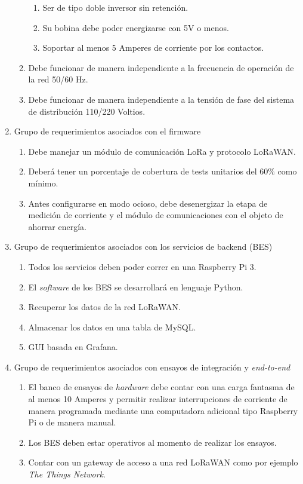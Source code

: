 \begin{enumerate}
\begin{enumerate}
\begin{enumerate}
			\item Ser de tipo doble inversor sin retención.
			\item Su bobina debe poder energizarse con 5V o menos.
			\item Soportar al menos 5 Amperes de corriente por los contactos.
		\end{enumerate} 
		\item Debe funcionar de manera independiente a la frecuencia de operación de la red 50/60 Hz.
		\item Debe funcionar de manera independiente a la tensión de fase del sistema de distribución 110/220 Voltios.
	\end{enumerate}
	\item Grupo de requerimientos asociados con el firmware
	\begin{enumerate}
		\item Debe manejar un módulo de comunicación LoRa y protocolo LoRaWAN.
		\item Deberá tener un porcentaje de cobertura de tests unitarios del 60\% como mínimo.
		\item Antes configurarse en modo ocioso, debe desenergizar la etapa de medición de corriente y el módulo de comunicaciones con el objeto de ahorrar energía.
	\end{enumerate}
	
	\item Grupo de requerimientos asociados con los servicios de backend (BES)
	\label{requerimientos_backend}
	\begin{enumerate}
		\item Todos los servicios deben poder correr en una Raspberry Pi 3.
		\item El \textit{software} de los BES se desarrollará en lenguaje Python.
		\item Recuperar los datos de la red LoRaWAN.\label{requerimiento_LORAWAN}
		\item Almacenar los datos en una tabla de MySQL.
		\item GUI basada en Grafana.
	\end{enumerate}
	
	\item Grupo de requerimientos asociados con ensayos de integración y \textit{end-to-end}
	\begin{enumerate}
		\item El banco de ensayos de \textit{hardware} debe contar con una carga fantasma de al menos 10 Amperes y permitir realizar interrupciones de corriente de manera programada mediante una computadora adicional tipo Raspberry Pi o de manera manual.
		\item Los BES deben estar operativos al momento de realizar los ensayos.
		\item Contar con un gateway de acceso a una red LoRaWAN como por ejemplo \textit{The Things Network}.
	\end{enumerate}
\end{enumerate}


